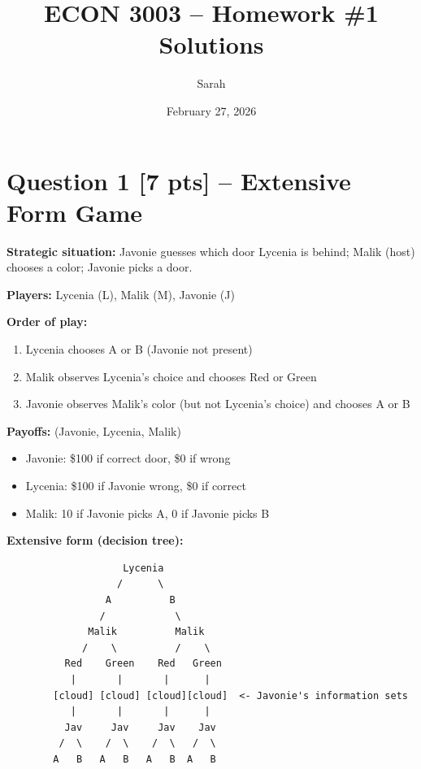 \documentclass[
]{article}
\title{ECON 3003 -- Homework \#1 Solutions}
\author{Sarah}
\date{February 27, 2026}
\providecommand{\tightlist}{%
  \setlength{\itemsep}{0pt}\setlength{\parskip}{0pt}}
\begin{document}
\maketitle

\newpage

\section{Question 1 {[}7 pts{]} -- Extensive Form
Game}\label{question-1-7-pts-extensive-form-game}

\textbf{Strategic situation:} Javonie guesses which door Lycenia is
behind; Malik (host) chooses a color; Javonie picks a door.

\textbf{Players:} Lycenia (L), Malik (M), Javonie (J)

\textbf{Order of play:}

\begin{enumerate}
\def\labelenumi{\arabic{enumi}.}
\tightlist
\item
  Lycenia chooses A or B (Javonie not present)
\item
  Malik observes Lycenia's choice and chooses Red or Green
\item
  Javonie observes Malik's color (but not Lycenia's choice) and chooses
  A or B
\end{enumerate}

\textbf{Payoffs:} (Javonie, Lycenia, Malik)

\begin{itemize}
\tightlist
\item
  Javonie: \$100 if correct door, \$0 if wrong
\item
  Lycenia: \$100 if Javonie wrong, \$0 if correct
\item
  Malik: 10 if Javonie picks A, 0 if Javonie picks B
\end{itemize}

\textbf{Extensive form (decision tree):}

\begin{verbatim}
                    Lycenia
                   /      \
                 A          B
                /            \
              Malik          Malik
             /    \          /    \
          Red    Green    Red   Green
           |       |       |      |
        [cloud] [cloud] [cloud][cloud]  <- Javonie's information sets
           |       |       |      |
          Jav     Jav     Jav    Jav
         /  \    /  \    /  \   /  \
        A   B   A   B   A   B  A   B
\end{verbatim}
\end{document}
